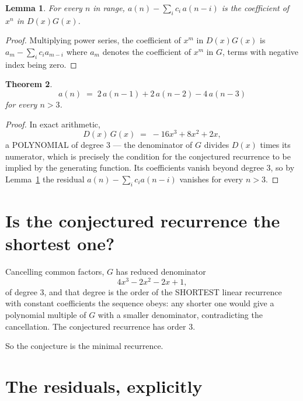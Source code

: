 \documentclass[11pt,a4paper]{article}
\theoremstyle{plain}
\newtheorem{theorem}{Theorem}
\newtheorem{lemma}[theorem]{Lemma}
\theoremstyle{definition}
\begin{document}
\begin{lemma}\label{lem:key}
For every $n$ in range, $a(n)-\sum_i c_i\,a(n-i)$ is the coefficient of $x^{n}$ in
$D(x)G(x)$.
\end{lemma}

\begin{proof}
Multiplying power series, the coefficient of $x^{m}$ in $D(x)G(x)$ is
$a_m-\sum_i c_i a_{m-i}$ where $a_m$ denotes the coefficient of $x^{m}$ in $G$, terms with
negative index being zero.
\end{proof}

\begin{theorem}
\[
a(n)\;=\;2\,a(n-1) + 2\,a(n-2) - 4\,a(n-3)
\]
for every $n>3$.
\end{theorem}

\begin{proof}
In exact arithmetic,
\[
D(x)\,G(x)\;=\;- 16 x^{3} + 8 x^{2} + 2 x,
\]
a POLYNOMIAL of degree $3$ --- the denominator of $G$ divides $D(x)$ times its numerator,
which is precisely the condition for the conjectured recurrence to be implied by the
generating function. Its coefficients vanish beyond degree $3$, so by
Lemma~\ref{lem:key} the residual $a(n)-\sum_ic_ia(n-i)$ vanishes for every
$n>3$.
\end{proof}

\section{Is the conjectured recurrence the shortest one?}

Cancelling common factors, $G$ has reduced denominator
\[
4 x^{3} - 2 x^{2} - 2 x + 1,
\]
of degree $3$, and that degree is the order of the SHORTEST linear recurrence with
constant coefficients the sequence obeys: any shorter one would give a polynomial multiple of
$G$ with a smaller denominator, contradicting the cancellation. The conjectured recurrence has
order $3$.

So the conjecture is the minimal recurrence.

\section{The residuals, explicitly}
\end{document}
